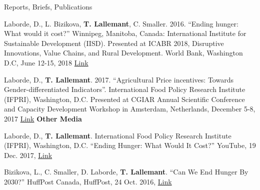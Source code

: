 \documentclass{resume} %
\begin{document}
\begin{rSection}{Reports, Briefs, Publications}
\item Laborde, D., L. Bizikova, \textbf{T. Lallemant}, C. Smaller. 2016. “Ending hunger: What would it cost?” Winnipeg,
Manitoba, Canada: International Institute for Sustainable Development (IISD). Presented at ICABR 2018,
Disruptive Innovations, Value Chains, and Rural Development. World Bank, Washington D.C, June 12-15,
2018
 \href{http://www.worldbank.org/en/events/2017/10/11/disruptive-innovations-value-chains-and-ruraldevelopment} {Link}
\item Laborde, D., \textbf{T. Lallemant}. 2017. “Agricultural Price incentives: Towards Gender-differentiated Indicators”.
International Food Policy Research Institute (IFPRI), Washington, D.C. Presented at CGIAR Annual Scientific
Conference and Capacity Development Workshop in Amsterdam, Netherlands, December 5-8, 2017
 \href{http://gender.cgiar.org/call-papers-cgiar-collaborative-platform-gender-research-scientific-conferencedecember-
5-6-2017} {Link}
\vskip 0.02in
{\bf Other Media}
\item Laborde, D., \textbf{T. Lallemant}. International Food Policy Research Institute (IFPRI), Washington, D.C. “Ending
Hunger: What Would It Cost?” YouTube, 19 Dec. 2017,
 \href{www.youtube.com/watch?v=l9N8Wwm4yIc&feature=youtu.be}{Link}
\item Bizikova, L., C. Smaller, D. Laborde, \textbf{T. Lallemant}. “Can We End Hunger By 2030?” HuffPost Canada,
HuffPost, 24 Oct. 2016, 
 \href{www.huffingtonpost.ca/development-unplugged/can-we-end-hunger-by-2030_b_12588908.html}{Link}


\end{rSection}
\end{document}
